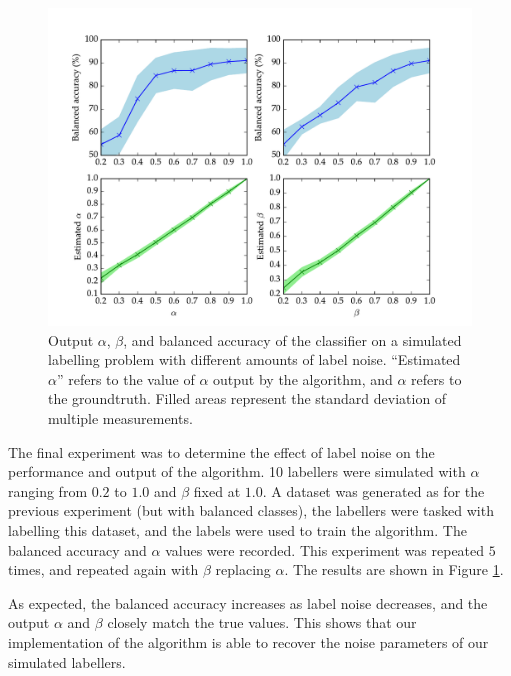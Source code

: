             \begin{figure}
                \centering
                \includegraphics[width=\textwidth]
                    {images/experiments/raykar_noise}
                \caption{Output $\alpha$, $\beta$, and balanced accuracy of the
                    \citeauthor{raykar10} classifier on a simulated labelling
                    problem with different amounts of label noise. ``Estimated
                    $\alpha$'' refers to the value of $\alpha$ output by the
                    algorithm, and $\alpha$ refers to the groundtruth. Filled
                    areas represent the standard deviation of multiple
                    measurements.}
                \label{fig:raykar-noise}
            \end{figure}

            The final experiment was to determine the effect of label noise on
            the performance and output of the algorithm. 10 labellers were
            simulated with $\alpha$ ranging from $0.2$ to $1.0$ and $\beta$
            fixed at $1.0$. A dataset was generated as for the previous
            experiment (but with balanced classes), the labellers were tasked
            with labelling this dataset, and the labels were used to train the
            algorithm. The balanced accuracy and $\alpha$ values were recorded.
            This experiment was repeated $5$ times, and repeated again with
            $\beta$ replacing $\alpha$. The results are shown in Figure
            \ref{fig:raykar-noise}.

            As expected, the balanced accuracy increases as label noise
            decreases, and the output $\alpha$ and $\beta$ closely match the
            true values. This shows that our implementation of the
            \citeauthor{raykar10} algorithm is able to recover the noise
            parameters of our simulated labellers.

